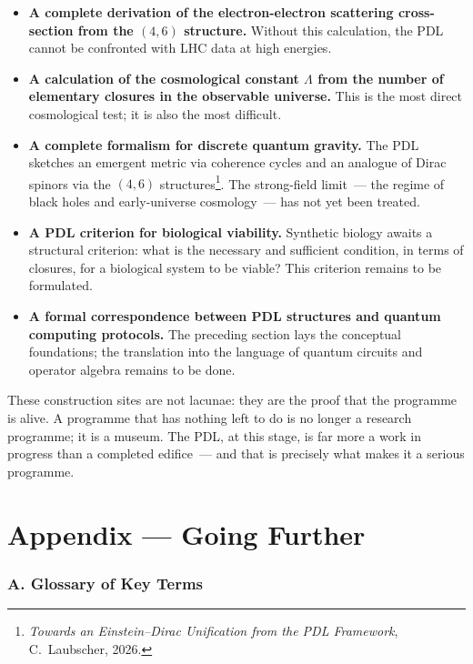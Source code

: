 \documentclass[12pt, a4paper, openright]{book}
\begin{document}
\begin{itemize}
\item \textbf{A complete derivation of the electron-electron scattering cross-section from the $(4,6)$ structure.} Without this calculation, the PDL cannot be confronted with LHC data at high energies.
\item \textbf{A calculation of the cosmological constant $\Lambda$ from the number of elementary closures in the observable universe.} This is the most direct cosmological test; it is also the most difficult.
\item \textbf{A complete formalism for discrete quantum gravity.} The PDL sketches an emergent metric via coherence cycles and an analogue of Dirac spinors via the $(4,6)$ structures\footnote{\textit{Towards an Einstein--Dirac Unification from the PDL Framework}, C.~Laubscher, 2026.}. The strong-field limit~--- the regime of black holes and early-universe cosmology~--- has not yet been treated.
\item \textbf{A PDL criterion for biological viability.} Synthetic biology awaits a structural criterion: what is the necessary and sufficient condition, in terms of closures, for a biological system to be viable? This criterion remains to be formulated.
\item \textbf{A formal correspondence between PDL structures and quantum computing protocols.} The preceding section lays the conceptual foundations; the translation into the language of quantum circuits and operator algebra remains to be done.
\end{itemize}

These construction sites are not lacunae: they are the proof that the programme is alive. A programme that has nothing left to do is no longer a research programme; it is a museum. The PDL, at this stage, is far more a work in progress than a completed edifice~--- and that is precisely what makes it a serious programme.

\backmatter
\appendix

\chapter*{Appendix — Going Further}

\subsection*{A. Glossary of Key Terms}
\end{document}
